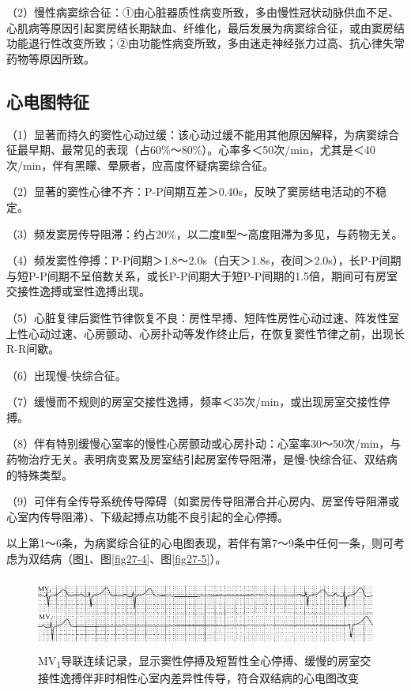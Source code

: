 （2）慢性病窦综合征：①由心脏器质性病变所致，多由慢性冠状动脉供血不足、心肌病等原因引起窦房结长期缺血、纤维化，最后发展为病窦综合征，或由窦房结功能退行性改变所致；②由功能性病变所致，多由迷走神经张力过高、抗心律失常药物等原因所致。

\protect\hypertarget{text00034.htmlux5cux23subid410}{}{}

\subsection{心电图特征}

（1）显著而持久的窦性心动过缓：该心动过缓不能用其他原因解释，为病窦综合征最早期、最常见的表现（占60\%～80\%）。心率多＜50次/min，尤其是＜40次/min，伴有黑矇、晕厥者，应高度怀疑病窦综合征。

（2）显著的窦性心律不齐：P-P间期互差＞0.40s，反映了窦房结电活动的不稳定。

（3）频发窦房传导阻滞：约占20\%，以二度Ⅱ型～高度阻滞为多见，与药物无关。

（4）频发窦性停搏：P-P间期＞1.8～2.0s（白天＞1.8s，夜间＞2.0s），长P-P间期与短P-P间期不呈倍数关系，或长P-P间期大于短P-P间期的1.5倍，期间可有房室交接性逸搏或室性逸搏出现。

（5）心脏复律后窦性节律恢复不良：房性早搏、短阵性房性心动过速、阵发性室上性心动过速、心房颤动、心房扑动等发作终止后，在恢复窦性节律之前，出现长R-R间歇。

（6）出现慢-快综合征。

（7）缓慢而不规则的房室交接性逸搏，频率＜35次/min，或出现房室交接性停搏。

（8）伴有特别缓慢心室率的慢性心房颤动或心房扑动：心室率30～50次/min，与药物治疗无关。表明病变累及房室结引起房室传导阻滞，是慢-快综合征、双结病的特殊类型。

（9）可伴有全传导系统传导障碍（如窦房传导阻滞合并心房内、房室传导阻滞或心室内传导阻滞）、下级起搏点功能不良引起的全心停搏。

以上第1～6条，为病窦综合征的心电图表现，若伴有第7～9条中任何一条，则可考虑为双结病（图\ref{fig27-3}、图\ref{fig27-4}、图\ref{fig27-5}）。

\begin{figure}[!htbp]
 \centering
 \includegraphics[width=5.58333in,height=0.94792in]{./images/Image00458.jpg}
 \captionsetup{justification=centering}
 \caption{MV\textsubscript{1}导联连续记录，显示窦性停搏及短暂性全心停搏、缓慢的房室交接性逸搏伴非时相性心室内差异性传导，符合双结病的心电图改变}
 \label{fig27-3}
  \end{figure} 


